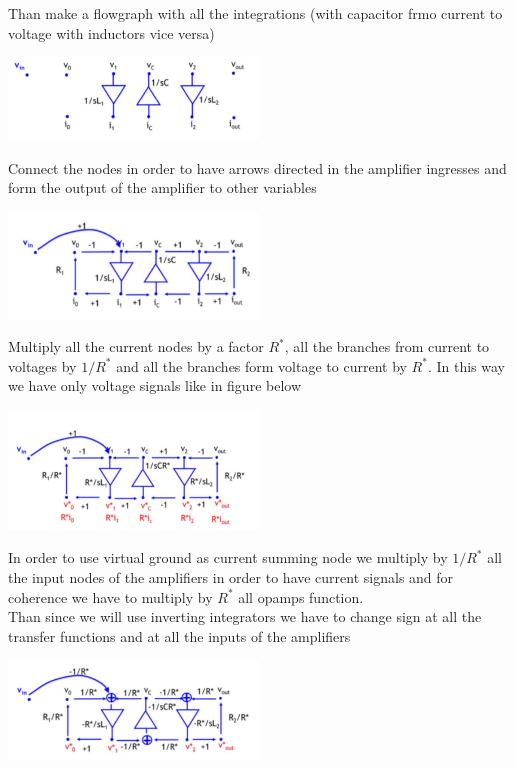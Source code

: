 Than make a flowgraph with all the integrations (with capacitor frmo current to voltage with inductors vice versa)

\centering
\includegraphics[width=0.5\textwidth]{ldd2.png}\\
\raggedright

Connect the nodes in order to have arrows directed in the amplifier ingresses and form the output of the amplifier to other variables

\centering
\includegraphics[width=0.5\textwidth]{ldd3.png}\\
\raggedright

Multiply all the current nodes by a factor $R^*$, all the branches from current to voltages by $1/R^*$ and all the branches form voltage to current by $R^*$. In this way we have only voltage signals like in figure below

\centering
\includegraphics[width=0.5\textwidth]{ldd4.png}\\
\raggedright

In order to use virtual ground as current summing node we multiply by $1/R^*$ all the input nodes of the amplifiers in order to have current signals and for coherence we have to multiply by $R^*$ all opamps function.\\
Than since we will use inverting integrators we have to change sign at all the transfer functions and at all the inputs of the amplifiers

\centering
\includegraphics[width=0.5\textwidth]{ldd5.png}\\
\raggedright

